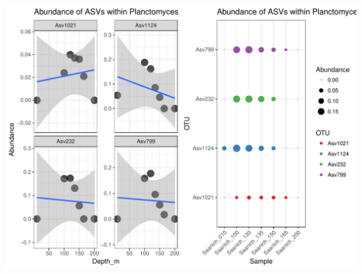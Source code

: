 \documentclass[11 pt,]{article}
\begin{document}
\includegraphics{Figs/unnamed-chunk-16-1.pdf}
\end{document}
